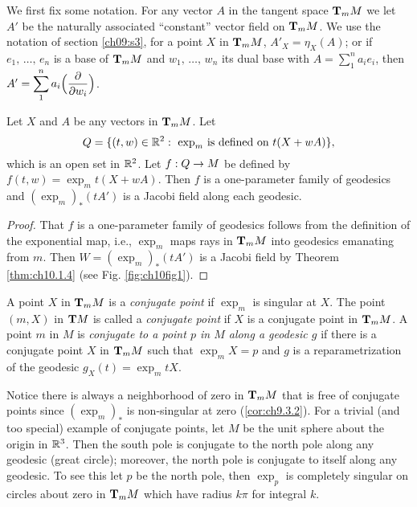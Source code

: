 \documentclass[../main]{subfiles}
\begin{document}
We first fix some notation. For any vector $A$ in the tangent space $\tangentspace{M}{m}$ we let $A'$ be the naturally associated ``constant'' vector field on $\tangentspace{M}{m}$. We use the notation of section \ref{ch09:s3}, for a point $X$ in $\tangentspace{M}{m}$, $A'_X=\eta_X(A)$; or if $e_1,\, \hdots,\, e_n$ is a base of $\tangentspace{M}{m}$ and $w_1,\, \hdots,\, w_n$ its dual base with $A=\displaystyle\sum_1^n a_ie_i$, then $A'=\displaystyle\sum_1^n a_i\Big(\pdv{}{w_i}\Big)$.



\begin{theorem} \label{thm:ch10.1.7}
Let $X$ and $A$ be any vectors in $\tangentspace{M}{m}$. Let
\[
Q
=
\{ (t,w)\in\bR^2:~ 
   \text{$\exp_m$ is defined on $t(X+wA)$} \},
\]
which is an open set in $\bR^2$. Let $f: Q\functionMaps M$ be defined by $f(t,w)=\exp_m t(X+wA)$. Then $f$ is a one-parameter family of geodesics and $(\exp_m)_\ast(tA')$ is a Jacobi field along each geodesic.
\end{theorem}

\begin{proof}
That $f$ is a one-parameter family of geodesics follows from the definition of the exponential map, i.e., $\exp_m$ maps rays in $\tangentspace{M}{m}$ into geodesics emanating from $m$. Then $W=(\exp_m)_\ast(tA')$ is a Jacobi field by Theorem \ref{thm:ch10.1.4} (see Fig. \ref{fig:ch10fig1}).
\end{proof}




A point $X$ in $\tangentspace{M}{m}$ is a \emph{conjugate point} if $\exp_m$ is singular at $X$. The point $(m,X)$ in $\tangentbundle{M}$ is called a \emph{conjugate point} if $X$ is a conjugate point in $\tangentspace{M}{m}$. A point $m$ in $M$ is \emph{conjugate to a point $p$ in $M$ along a geodesic $g$} if there is a conjugate point $X$ in $\tangentspace{M}{m}$ such that $\exp_m X=p$ and $g$ is a reparametrization of the geodesic $g_X(t)=\exp_m tX$.

Notice there is always a neighborhood of zero in $\tangentspace{M}{m}$ that is free of conjugate points since $(\exp_m)_\ast$ is non-singular at zero (\ref{cor:ch9.3.2}). For a trivial (and too special) example of conjugate points, let $M$ be the unit sphere about the origin in $\bR^3$. Then the south pole is conjugate to the north pole along any geodesic (great circle); moreover, the north pole is conjugate to itself along any geodesic. To see this let $p$ be the north pole, then $\exp_p$ is completely singular on circles about zero in $\tangentspace{M}{m}$ which have radius $k\pi$ for integral $k$.
\end{document}
